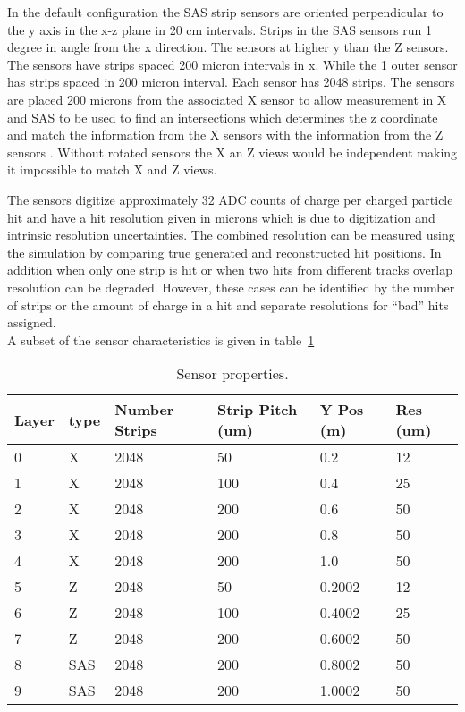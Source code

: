 \documentclass[aps,prd,superscriptaddress,floatfix]{revtex4}
\begin{document}
In the default configuration the SAS strip sensors are oriented perpendicular to the y axis in
the x-z plane in 20 cm intervals.  Strips in the SAS sensors run 1 degree in angle from the x
direction.  The sensors at higher y than the Z sensors.  The  sensors have strips spaced 200 micron
intervals in x. While the 1 outer sensor has strips spaced in 200 micron
interval.  Each sensor has 2048 strips.  The sensors are placed 200 microns from the associated X sensor to allow measurement in X
and SAS to be used to find an intersections which determines the z coordinate and match the information from the X sensors with the 
information from the Z sensors .  Without rotated sensors the X an Z views would be independent making it impossible to match X and Z
views.


The sensors digitize approximately 32 ADC counts of charge per charged
particle hit and have a hit resolution given in microns which is due to
digitization and intrinsic resolution uncertainties.  The combined resolution
can be measured using the simulation by comparing true generated and reconstructed
hit positions.  In addition when only one strip is hit or when two hits from
different tracks overlap resolution can be degraded.  However, these cases can
be identified by the number of strips or the amount of charge in a hit and separate
resolutions for ``bad'' hits assigned.
\\

A subset of the sensor characteristics is given in table~\ref{tab:detectorTable}
\\

\begin{table}
\caption{\label{tab:detectorTable} Sensor properties.}
\begin{tabular}{|l|l|l|l|l|l|}
\hline 
Layer & type & Number Strips & Strip Pitch (um) & Y Pos (m) & Res (um)\\
\hline
0 & X & 2048 & 50	& 0.2 & 12	 \\
1 & X & 2048 & 100	& 0.4 & 25	 \\
2 & X & 2048 & 200	& 0.6 & 50	 \\
3 & X & 2048 & 200	& 0.8 & 50	 \\
4 & X & 2048 & 200	& 1.0 & 50	 \\
5 & Z & 2048 & 50	& 0.2002 & 12	 \\
6 & Z & 2048 & 100	& 0.4002 & 25	 \\
7 & Z & 2048 & 200	& 0.6002 & 50	 \\
8 & SAS & 2048 & 200	& 0.8002 & 50	 \\
9 & SAS & 2048 & 200	& 1.0002 & 50	 \\
\hline
\end{tabular}
\end{table}
\end{document}
